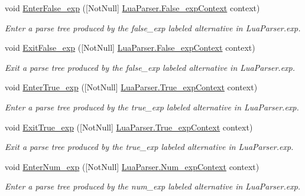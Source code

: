 \begin{DoxyCompactItemize}
void \mbox{\hyperlink{interfacezlua_1_1_i_lua_listener_acaeea04a84e6859bedcaa48c486cb640}{Enter\+False\+\_\+exp}} (\mbox{[}Not\+Null\mbox{]} \mbox{\hyperlink{classzlua_1_1_lua_parser_1_1_false__exp_context}{Lua\+Parser.\+False\+\_\+exp\+Context}} context)
\begin{DoxyCompactList}\small\item\em Enter a parse tree produced by the {\ttfamily false\+\_\+exp} labeled alternative in Lua\+Parser.\+exp. \end{DoxyCompactList}\item 
void \mbox{\hyperlink{interfacezlua_1_1_i_lua_listener_a78a5b4e244b54f1233447bc8da8f1ac2}{Exit\+False\+\_\+exp}} (\mbox{[}Not\+Null\mbox{]} \mbox{\hyperlink{classzlua_1_1_lua_parser_1_1_false__exp_context}{Lua\+Parser.\+False\+\_\+exp\+Context}} context)
\begin{DoxyCompactList}\small\item\em Exit a parse tree produced by the {\ttfamily false\+\_\+exp} labeled alternative in Lua\+Parser.\+exp. \end{DoxyCompactList}\item 
void \mbox{\hyperlink{interfacezlua_1_1_i_lua_listener_af32ce4f4ae58233d0a29cf03e5183347}{Enter\+True\+\_\+exp}} (\mbox{[}Not\+Null\mbox{]} \mbox{\hyperlink{classzlua_1_1_lua_parser_1_1_true__exp_context}{Lua\+Parser.\+True\+\_\+exp\+Context}} context)
\begin{DoxyCompactList}\small\item\em Enter a parse tree produced by the {\ttfamily true\+\_\+exp} labeled alternative in Lua\+Parser.\+exp. \end{DoxyCompactList}\item 
void \mbox{\hyperlink{interfacezlua_1_1_i_lua_listener_a9d5a4a9bd56969dc9b5269fd3049187d}{Exit\+True\+\_\+exp}} (\mbox{[}Not\+Null\mbox{]} \mbox{\hyperlink{classzlua_1_1_lua_parser_1_1_true__exp_context}{Lua\+Parser.\+True\+\_\+exp\+Context}} context)
\begin{DoxyCompactList}\small\item\em Exit a parse tree produced by the {\ttfamily true\+\_\+exp} labeled alternative in Lua\+Parser.\+exp. \end{DoxyCompactList}\item 
void \mbox{\hyperlink{interfacezlua_1_1_i_lua_listener_aaa1853b8a53c94c2e6a7ee14bc38a698}{Enter\+Num\+\_\+exp}} (\mbox{[}Not\+Null\mbox{]} \mbox{\hyperlink{classzlua_1_1_lua_parser_1_1_num__exp_context}{Lua\+Parser.\+Num\+\_\+exp\+Context}} context)
\begin{DoxyCompactList}\small\item\em Enter a parse tree produced by the {\ttfamily num\+\_\+exp} labeled alternative in Lua\+Parser.\+exp. \end{DoxyCompactList}\item 

\end{DoxyCompactItemize}
